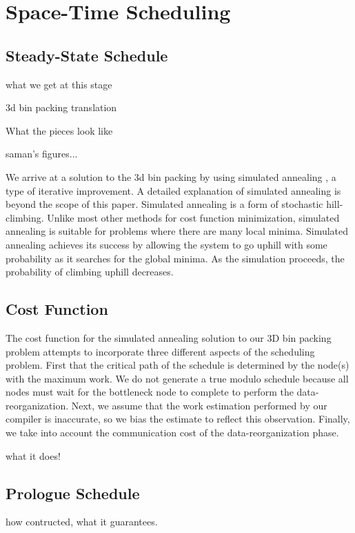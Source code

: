 \section{Space-Time Scheduling}
\label{sec:scheduling}
\subsection{Steady-State Schedule}


what we get at this stage

3d bin packing translation

What the pieces look like 

saman's figures...

We arrive at a solution to the 3d bin packing by using simulated
annealing \cite{simanneal}, a type of iterative improvement.  A
detailed explanation of simulated annealing is beyond the scope of
this paper.  Simulated annealing is a form of stochastic
hill-climbing. Unlike most other methods for cost function
minimization, simulated annealing is suitable for problems where there
are many local minima.  Simulated annealing achieves its success by
allowing the system to go uphill with some probability as it searches
for the global minima.  As the simulation proceeds, the probability of
climbing uphill decreases.


\subsection{Cost Function}
The cost function for the simulated annealing solution to our 3D bin
packing problem attempts to incorporate three different aspects of the
scheduling problem.  First that the critical path of the schedule is
determined by the node(s) with the maximum work.  We do not generate a
true modulo schedule because all nodes must wait for the bottleneck
node to complete to perform the data-reorganization.  Next, we assume
that the work estimation performed by our compiler is inaccurate, so
we bias the estimate to reflect this observation.  Finally, we take
into account the communication cost of the data-reorganization phase.



what it does!

\subsection{Prologue Schedule}
how contructed, what it guarantees.

